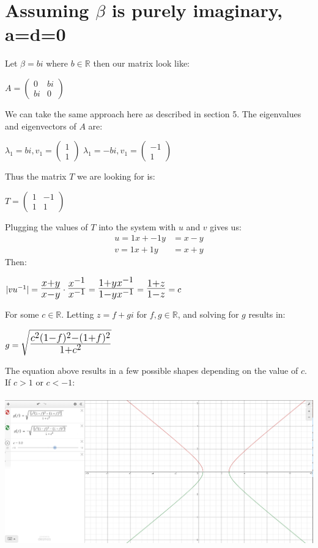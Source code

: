 \documentclass[10pt]{article}
\def\mathLarge#1{\mbox{\LARGE $#1$}}
\begin{document}
\section{Assuming $\beta$ is purely imaginary, a=d=0}
Let $\beta = bi$ where $b\in\mathbb{R}$ then our matrix look like:
\begin{center}
$A = \begin{pmatrix}0&bi\\bi&0\end{pmatrix}$
\end{center}
We can take the same approach here as described in section 5. The eigenvalues and eigenvectors of $A$ are:
\begin{center}
$\lambda_1=bi, v_1=\begin{pmatrix}1\\1\end{pmatrix}$
$\lambda_1=-bi, v_1=\begin{pmatrix}-1\\1\end{pmatrix}$
\end{center}
Thus the matrix $T$ we are looking for is:
\begin{center}
$T = \begin{pmatrix}1&-1\\1&1\end{pmatrix}$
\end{center}
Plugging the values of $T$ into the system with $u$ and $v$ gives us:
\begin{align*}
u = 1x+-1y &= x-y\\
v = 1x+1y &= x+y
\end{align*}
Then:
\begin{center}
$|vu^{-1}|= \mathLarge{\frac{x + y}{x - y}}\cdot\mathLarge{\frac{x^{-1}}{x^{-1}}}=
\mathLarge{\frac{1 + yx^{-1}}{1 - yx^{-1}}} = \mathLarge{\frac{1 + z}{1 - z}} = c$
\end{center}
For some $c\in\mathbb{R}$. Letting $z=f+gi$ for $f,g\in\mathbb{R}$, and solving for $g$ results in:
\begin{center}
$g = \mathLarge{\sqrt{\frac{c^{2}(1-f)^{2} - (1+f)^{2}}{1+c^{2}}}}$
\end{center}
The equation above results in a few possible shapes depending on the value of $c$.\\
If $c>1$ or $c<-1$:\\\\
\includegraphics[width=\textwidth]{Figure4}\\
\end{document}
